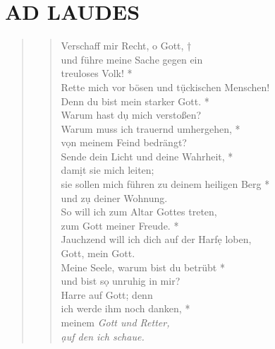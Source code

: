 
\section[DIENSTAG]{AD LAUDES}

\def\greinitialformat#1{{\fontsize{40}{40}\selectfont #1}}
\gresetfirstlineaboveinitial{\small \textcolor{red}{ Ps 43}}{}
\setaboveinitialseparation{0.72mm}


\vspace{0.6cm}

\begin{quote}
\begin{verse}
Verschaff mir Recht, o Gott, †\\
und führe meine Sache gegen ein \\
treuloses Volk! *\\  
Rette mich vor bösen und t\d ückischen Menschen!\\ 
\vin Denn du bist mein starker Gott. *\\ 
\vin Warum hast d\d u mich verstoßen? \\
Warum muss ich trauernd umhergehen, *\\  
v\d on meinem Feind bedrängt?\\ 
\vin Sende dein Licht und deine Wahrheit, *\\ 
\vin dam\d it sie mich leiten; \\
sie sollen mich führen zu deinem heiligen Berg *\\  
und z\d u deiner Wohnung. \\ 
\vin So will ich zum Altar Gottes treten,\\ 
\vin zum Gott meiner Freude. *\\ 
\vin Jauchzend will ich dich auf der Harf\d e loben,\\ 
\vin Gott, mein Gott. \\
Meine Seele, warum bist du betrübt *\\ 
und bist s\d o unruhig in mir? \\ 
\vin Harre auf Gott; denn\\ 
\vin ich werde ihm noch danken, *\\ 
\vin  meinem \textit{Gott und Retter,\\ 
\vin \d auf den ich schaue.}\\

\end{verse}
\end{quote}


